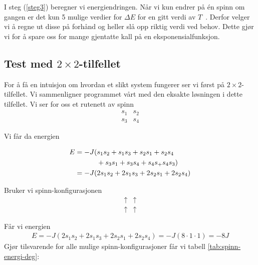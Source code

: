 \documentclass[11pt]{article}
\begin{document}
I steg (\ref{steg3}) beregner vi energiendringen. Når vi kun endrer på
én spinn om gangen er det kun 5 mulige verdier for $\Delta E$ for en
gitt verdi av $T$~\cite[s. 436]{Lecture-notes}. Derfor velger vi å
regne ut disse på forhånd og heller slå opp riktig verdi ved
behov. Dette gjør vi for å spare oss for mange gjentatte kall på en
eksponensialfunksjon. 


\subsection{Test med $2 \times 2$-tilfellet}
For å få en intuisjon om hvordan et slikt system fungerer ser vi først på 
$2 \times 2$-tilfellet. Vi sammenligner programmet vårt med den 
eksakte løsningen i dette tilfellet. Vi ser for oss et rutenett av spinn
\begin{align*}
s_1 & s_2 \\
s_3 & s_4  
\end{align*}

Vi får da energien

\begin{align*}
E &= -J ( s_1s_2 + s_1s_3 + s_2s_1 + s_2s_4 \\
&  \hspace{1.1cm}+ s_3s_1 + s_3s_4 + s_4s_ + s_4s_3) \\ 
&= - J  ( 2s_1s_2 + 2s_1s_3 + 2s_2s_1 + 2s_2s_4 ) 
\end{align*}

Bruker vi spinn-konfigurasjonen
\begin{align*}
\uparrow & \uparrow \\
\uparrow & \uparrow
\end{align*}

Får vi energien 
\begin{align*}
E = - J  ( 2s_1s_2 + 2s_1s_3 + 2s_2s_1 + 2s_2s_4 ) = -J ( 8 \cdot 1 \cdot 1) = -8J  
\end{align*}
Gjør tilsvarende for alle mulige spinn-konfigurasjoner får vi tabell \ref{tab:spinn-energi-deg}:
\end{document}
